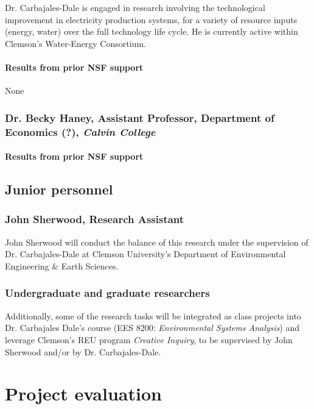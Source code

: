 \documentclass[11pt,a4paper]{article}
\begin{document}
Dr. Carbajales-Dale is engaged in research involving the technological improvement in electricity production systems, for a variety of resource inputs (energy, water) over the full technology life cycle. He is currently active within Clemson's Water-Energy Consortium. 


\paragraph{Results from prior NSF support}

None

\subsubsection{Dr. Becky Haney, Assistant Professor, Department of Economics (?), \emph{Calvin College}}

\paragraph{Results from prior NSF support}


\subsection{Junior personnel}

\subsubsection{John Sherwood, Research Assistant}

John Sherwood will conduct the balance of this research under the supervision of Dr. Carbajales-Dale at Clemson University's Department of Environmental Engineering \& Earth Sciences.


\subsubsection{Undergraduate and graduate researchers}

Additionally, some of the research tasks will be 
integrated as class projects into Dr. Carbajales Dale's course 
(EES 8200: \emph{Environmental Systems Analysis}) and  
leverage Clemson's REU program \emph{Creative Inquiry}, 
to be supervised by John Sherwood and/or by Dr. Carbajales-Dale.

\section{Project evaluation}
\end{document}
